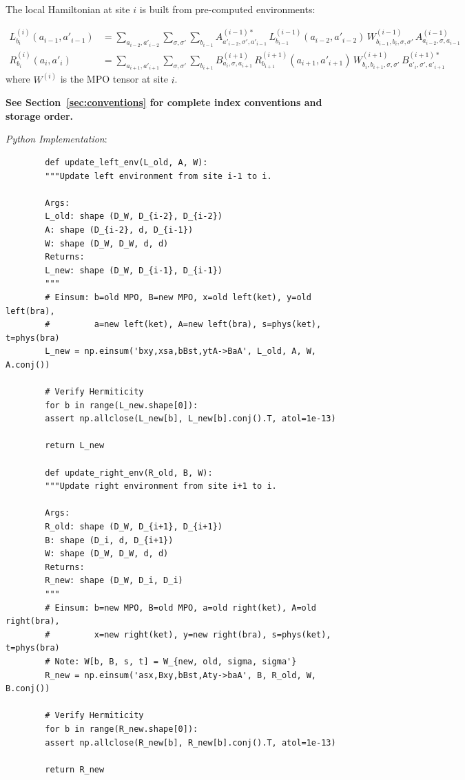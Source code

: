 \documentclass[aps,prb,onecolumn,scriptaddress]{revtex4-2}
\begin{document}
	The local Hamiltonian at site $i$ is built from pre-computed environments:
	
	\begin{align}
		L^{(i)}_{b_i}(a_{i-1}, a'_{i-1}) &= \sum_{a_{i-2}, a'_{i-2}} \sum_{\sigma, \sigma'} \sum_{b_{i-1}} A^{(i-1)*}_{a'_{i-2},\sigma',a'_{i-1}} \, L^{(i-1)}_{b_{i-1}}(a_{i-2}, a'_{i-2}) \, W^{(i-1)}_{b_{i-1},b_i,\sigma,\sigma'} \, A^{(i-1)}_{a_{i-2},\sigma,a_{i-1}} \\
		R^{(i)}_{b_i}(a_i, a'_i) &= \sum_{a_{i+1}, a'_{i+1}} \sum_{\sigma, \sigma'} \sum_{b_{i+1}} B^{(i+1)}_{a_i,\sigma,a_{i+1}} \, R^{(i+1)}_{b_{i+1}}(a_{i+1}, a'_{i+1}) \, W^{(i+1)}_{b_i,b_{i+1},\sigma,\sigma'} \, B^{(i+1)*}_{a'_i,\sigma',a'_{i+1}}
	\end{align}	
	where $W^{(i)}$ is the MPO tensor at site $i$.
	
	\textbf{See Section~\ref{sec:conventions} for complete index conventions and storage order.}
	
	\textit{Python Implementation}:
	\begin{verbatim}
		def update_left_env(L_old, A, W):
		"""Update left environment from site i-1 to i.
		
		Args:
		L_old: shape (D_W, D_{i-2}, D_{i-2})
		A: shape (D_{i-2}, d, D_{i-1})
		W: shape (D_W, D_W, d, d)
		Returns:
		L_new: shape (D_W, D_{i-1}, D_{i-1})
		"""
		# Einsum: b=old MPO, B=new MPO, x=old left(ket), y=old left(bra),
		#         a=new left(ket), A=new left(bra), s=phys(ket), t=phys(bra)
		L_new = np.einsum('bxy,xsa,bBst,ytA->BaA', L_old, A, W, A.conj())
		
		# Verify Hermiticity
		for b in range(L_new.shape[0]):
		assert np.allclose(L_new[b], L_new[b].conj().T, atol=1e-13)
		
		return L_new
		
		def update_right_env(R_old, B, W):
		"""Update right environment from site i+1 to i.
		
		Args:
		R_old: shape (D_W, D_{i+1}, D_{i+1})
		B: shape (D_i, d, D_{i+1})
		W: shape (D_W, D_W, d, d)
		Returns:
		R_new: shape (D_W, D_i, D_i)
		"""
		# Einsum: b=new MPO, B=old MPO, a=old right(ket), A=old right(bra),
		#         x=new right(ket), y=new right(bra), s=phys(ket), t=phys(bra)
		# Note: W[b, B, s, t] = W_{new, old, sigma, sigma'}
		R_new = np.einsum('asx,Bxy,bBst,Aty->baA', B, R_old, W, B.conj())
		
		# Verify Hermiticity
		for b in range(R_new.shape[0]):
		assert np.allclose(R_new[b], R_new[b].conj().T, atol=1e-13)
		
		return R_new
	\end{verbatim}
	
\end{document}
